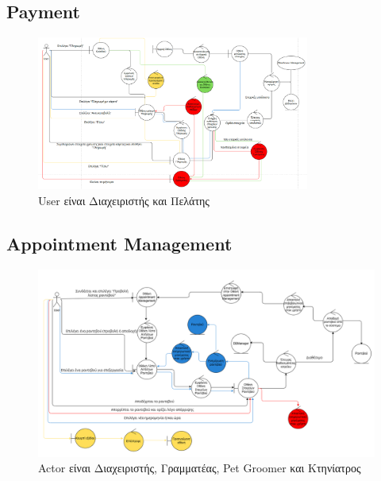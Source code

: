 \documentclass[12pt,a4paper,twoside]{book}
\begin{document}
\subsection{Payment}
\begin{figure}[H]
    \centering
    \includegraphics[width=0.8\textwidth]{Resources/Robustness Diagram/Payment.png}
    \caption{User είναι Διαχειριστής και Πελάτης}\label{fig:robustness-payment}
\end{figure}

\subsection{Appointment Management}
\begin{figure}[H]
    \centering
    \includegraphics[width=\textwidth]{Resources/Robustness Diagram/appointment-management.png}
    \caption{Actor είναι Διαχειριστής, Γραμματέας, Pet Groomer και Κτηνίατρος}\label{fig:robustness-appointment-management}
\end{figure}
\end{document}
